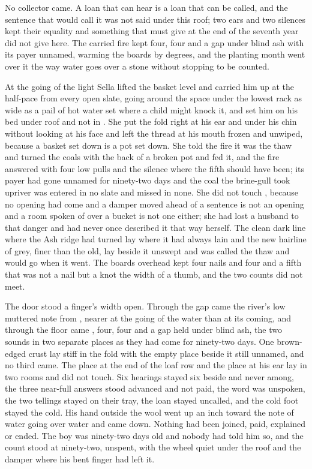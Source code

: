 No collector came. A loan that can hear is a loan that can be called, and the sentence that would call it was not said under this roof; two ears and two silences kept their equality and something that must give at the end of the seventh year did not give here. The carried fire kept four, four and a gap under blind ash with its payer unnamed, warming the boards by degrees, and the planting month went over it the way water goes over a stone without stopping to be counted.

At the going of the light Sella lifted the basket level and carried him up at the half-pace from every open slate, going around the space under the lowest rack as wide as a pail of hot water set where a child might knock it, and set him on his bed under  roof and not in . She put the fold right at his ear and under his chin without looking at his face and left the thread at his mouth frozen and unwiped, because a basket set down is a pot set down. She told the fire it was the thaw and turned the coals with the back of a broken pot and fed it, and the fire answered with four low pulls and the silence where the fifth should have been; its payer had gone unnamed for ninety-two days and the coal the brine-gull took upriver was entered in no slate and missed in none. She did not touch , because no opening had come and a damper moved ahead of a sentence is not an opening and a room spoken of over a bucket is not one either; she had lost a husband to that danger and had never once described it that way herself. The clean dark line where the Ash ridge had turned lay where it had always lain and the new hairline of grey, finer than the old, lay beside it unswept and was called the thaw and would go when it went. The boards overhead kept four nails and four and a fifth that was not a nail but a knot the width of a thumb, and the two counts did not meet.

The door stood a finger's width open. Through the gap came the river's low muttered note from , nearer at the going of the water than at its coming, and through the floor came , four, four and a gap held under blind ash, the two sounds in two separate places as they had come for ninety-two days. One brown-edged crust lay stiff in the fold with the empty place beside it still unnamed, and no third came. The place at the end of the loaf row and the place at his ear lay in two rooms and did not touch. Six hearings stayed six beside and never among, the three near-full answers stood advanced and not paid, the word was unspoken, the two tellings stayed on their tray, the loan stayed uncalled, and the cold foot stayed the cold. His hand outside the wool went up an inch toward the note of water going over water and came down. Nothing had been joined, paid, explained or ended. The boy was ninety-two days old and nobody had told him so, and the count stood at ninety-two, unspent, with the wheel quiet under the roof and the damper where his bent finger had left it.
